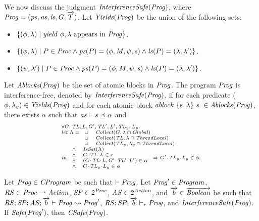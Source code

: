 We now discuss the judgment $\mathit{InterferenceSafe}(\mathit{Prog})$,
where $\mathit{Prog} = (\mathit{ps}, \mathit{as}, \mathit{ls}, G, \overrightarrow{T})$. 
Let $\mathit{Yields}(\mathit{Prog})$ be the union of the following sets:
\begin{itemize}
\item
$\{(\phi,\lambda) \mid \mathit{yield}\ \phi,\lambda~\mathrm{appears~in~\mathit{Prog}}\}$.
\item
$\{(\phi,\lambda) \mid P \in \mathit{Proc} \wedge \mathit{ps}(P) = (\phi, M, \psi, \mathit{s}) \wedge \mathit{ls}(P) = (\lambda,\lambda')\}$.
\item
$\{(\psi,\lambda') \mid P \in \mathit{Proc} \wedge \mathit{ps}(P) = (\phi, M, \psi, \mathit{s}) \wedge \mathit{ls}(P) = (\lambda,\lambda')\}$.
\end{itemize}
Let $\mathit{Ablocks}(\mathit{Prog})$ be the set of atomic blocks in $\mathit{Prog}$.
The program $\mathit{Prog}$ is interference-free, denoted by $\mathit{InterferenceSafe}(\mathit{Prog})$,
if for each predicate ($\phi,\lambda_y) \in \mathit{Yields}(\mathit{Prog})$ and 
for each atomic block $\mathit{ablock}\ {\{e,\lambda\}}\ {\mathit{s}}\  \in \mathit{Ablocks}(\mathit{Prog})$, there exists $\alpha$ such that 
$\mathit{as} \vdash \mathit{s} \preceq \alpha$ and 
\[
\scriptsize{
\begin{array}{l}
\forall \varsG,\varsTL,\varsL,\varsG',\varsTL',\varsL',\varsTL_y,\varsL_y.\\ 
\mathit{let}\ \Lambda =
\begin{array}[t]{ll}
\cup & \Collect(\varsG, \lins \cap \Global) \\
\cup & \Collect(\varsTL, \lins \cap \ThreadLocal) \\
\cup & \Collect(\varsTL_y, \lins_y \cap \ThreadLocal) 
\end{array} \\
\mathit{in}\
\begin{array}{ll}
\wedge & \IsSet(\Lambda) \\
\wedge & \MakeStore{\varsG}{\varsTL}{\varsL} \in e \\
\wedge & (\MakeStore{\varsG}{\varsTL}{\varsL}, \MakeStore{\varsG'}{\varsTL'}{\varsL'}) \in \alpha \\
\wedge & \MakeStore{\varsG}{\varsTL_y}{\varsL_y} \in \phi
\end{array}
\Rightarrow \MakeStore{\varsG'}{\varsTL_y}{\varsL_y} \in \phi.
\end{array}
}
\]

\begin{lemma}
Let $\mathit{Prog} \in \mathit{CProgram}$ be such that $\vdash \mathit{Prog}$.
Let $\mathit{Prog}' \in \mathit{Program}$, $\mathit{RS} \in \mathit{Proc} \rightharpoonup \mathit{Action}$, $\mathit{SP} \in 2^{\mathit{Proc}}$, $\mathit{AS} \in 2^{\mathit{Action}}$,
and $\overrightarrow{b} \in \overrightarrow{\mathit{Boolean}}$ be such that 
$\mathit{RS};\mathit{SP};\mathit{AS};\overrightarrow{b} \vdash \mathit{Prog} \leadsto \mathit{Prog}'$, $\mathit{RS};\mathit{SP};\overrightarrow{b} \vdash_r \mathit{Prog}$, and
$\mathit{InterferenceSafe}(\mathit{Prog})$.
If $\mathit{Safe}(\mathit{Prog}')$, then $\mathit{CSafe}(\mathit{Prog})$.
\end{lemma}

